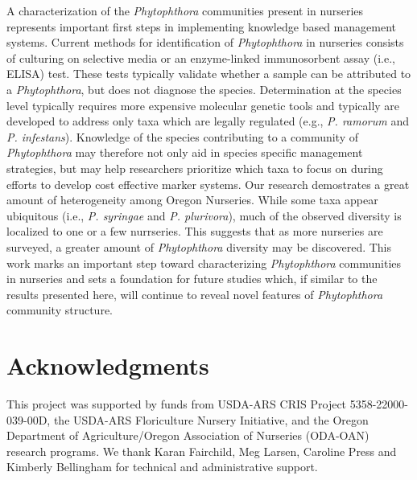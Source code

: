 \documentclass[12pt]{article}
\begin{document}

A characterization of the \emph{Phytophthora} communities present in nurseries represents important first steps in implementing knowledge based management systems.  Current methods for identification of \emph{Phytophthora} in nurseries consists of culturing on selective media \cite{jeffers_martin_1986} or an enzyme-linked immunosorbent assay (i.e., ELISA) test.  These tests typically validate whether a sample can be attributed to a \emph{Phytophthora}, but does not diagnose the species.  Determination at the species level typically requires more expensive molecular genetic tools \cite{grunwald_etal_2011} and typically are developed to address only taxa which are legally regulated (e.g., \emph{P. ramorum} and \emph{P. infestans}).  Knowledge of the species contributing to a community of \emph{Phytophthora} may therefore not only aid in species specific management strategies, but may help researchers prioritize which taxa to focus on during efforts to develop cost effective marker systems.  Our research demostrates a great amount of heterogeneity among Oregon Nurseries.  While some taxa appear ubiquitous (i.e., \emph{P. syringae} and \emph{P. plurivora}), much of the observed diversity is localized to one or a few nurrseries.  This suggests that as more nurseries are surveyed, a greater amount of \emph{Phytophthora} diversity may be discovered.  This work marks an important step toward characterizing \emph{Phytophthora} communities in nurseries and sets a foundation for future studies which, if similar to the results presented here, will continue to reveal novel features of \emph{Phytophthora} community structure.






\section*{\sffamily\normalsize{Acknowledgments}}
This project was supported by funds from USDA-ARS CRIS Project 5358-22000-039-00D, the USDA-ARS Floriculture Nursery Initiative, and the Oregon Department of Agriculture/Oregon Association of Nurseries (ODA-OAN) research programs. We thank Karan Fairchild, Meg Larsen, Caroline Press and Kimberly Bellingham for technical and administrative support. 
\end{document}
